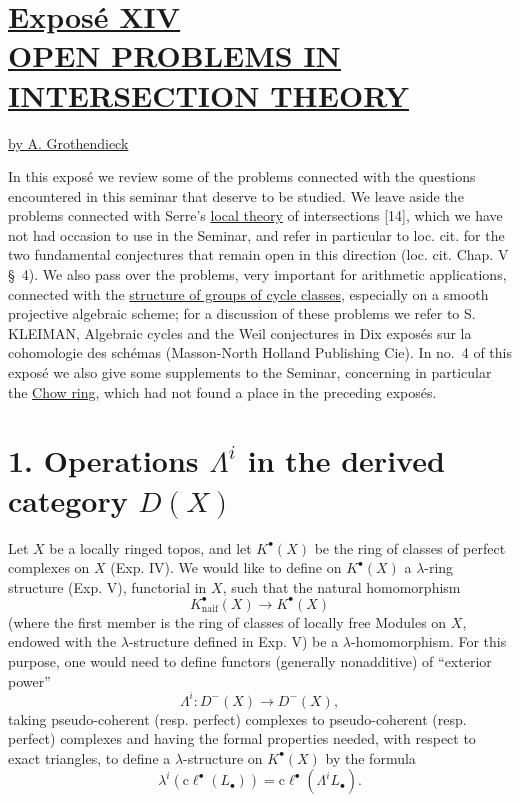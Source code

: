 %
\section*{\underline{Exposé XIV}\\[3pt] \underline{\underline{OPEN PROBLEMS IN INTERSECTION THEORY}}}
\begin{center}
\underline{by A. Grothendieck}
\end{center}

In this exposé we review some of the problems connected with the questions encountered in this seminar that deserve to be studied. We leave aside the problems connected with Serre's \uline{local theory} of intersections [14], which we have not had occasion to use in the Seminar, and refer in particular to loc. cit. for the two fundamental conjectures that remain open in this direction (loc. cit. Chap. V \S~4). We also pass over the problems, very important for arithmetic applications, connected with the \uline{structure of groups of cycle classes}, especially on a smooth projective algebraic scheme; for a discussion of these problems we refer to S. KLEIMAN, Algebraic cycles and the Weil conjectures in Dix exposés sur la cohomologie des schémas (Masson-North Holland Publishing Cie). In no.~4 of this exposé we also give some supplements to the Seminar, concerning in particular the \uline{Chow ring}, which had not found a place in the preceding exposés.

\section*{1. Operations $\Lambda^i$ in the derived category $D(X)$\SGAAuthorFootMark{*}}

Let $X$ be a locally ringed topos, and let $K^\bullet(X)$ be the ring of classes of perfect complexes on $X$ (Exp. IV). We would like to define on $K^\bullet(X)$ a $\lambda$-ring structure (Exp. V), functorial in $X$, such that the natural homomorphism
\[
 K^\bullet_{\mathrm{naif}}(X)\longrightarrow K^\bullet(X)
\]
(where the first member is the ring of classes of locally free Modules on $X$, endowed with the $\lambda$-structure defined in Exp. V) be a $\lambda$-homomorphism. For this purpose, one would need to define functors (generally nonadditive) of ``exterior power''
\[
 \Lambda^i:D^-(X)\longrightarrow D^-(X),
\]
taking pseudo-coherent (resp. perfect) complexes to pseudo-coherent (resp. perfect) complexes and having the formal properties needed, with respect to exact triangles, to define a $\lambda$-structure on $K^\bullet(X)$ by the formula
\begin{equation}\tag{1.1}
 \lambda^i(\mathrm{c}\ell^\bullet(L_\bullet))=\mathrm{c}\ell^\bullet(\Lambda^i L_\bullet).
\end{equation}

